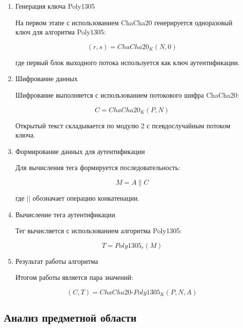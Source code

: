\documentclass[14pt, a4paper]{extarticle}
\begin{document}
	\begin{enumerate}
	
	\item Генерация ключа Poly1305
	
	На первом этапе с использованием ChaCha20 генерируется одноразовый ключ для алгоритма Poly1305:
	
	\begin{equation}
		(r, s) = ChaCha20_K(N, 0)
	\end{equation}
	
	где первый блок выходного потока используется как ключ аутентификации.
	
	\item Шифрование данных
	
	Шифрование выполняется с использованием потокового шифра ChaCha20:
	
	\begin{equation}
		C = ChaCha20_K(P, N)
	\end{equation}
	
	Открытый текст складывается по модулю 2 с псевдослучайным потоком ключа.
	
	\item Формирование данных для аутентификации
	
	Для вычисления тега формируется последовательность:
	
	\begin{equation}
		M = A \parallel C
	\end{equation}
	
	где $||$ обозначает операцию конкатенации.
	
	\item Вычисление тега аутентификации
	
	Тег вычисляется с использованием алгоритма Poly1305:
	
	\begin{equation}
		T = Poly1305_{r}(M)
	\end{equation}
	
	\item Результат работы алгоритма
	
	Итогом работы является пара значений:
	
	\begin{equation}
		(C, T) = ChaCha20\text{-}Poly1305_K(P, N, A)
	\end{equation}
	
	\end{enumerate}
	
	\subsection{Анализ предметной области}
			
\end{document}
